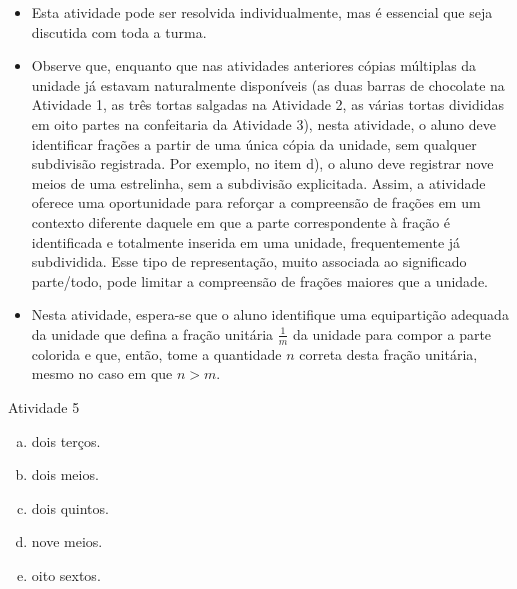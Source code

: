 \begin{multicols}{2}
  \begin{itemize} %
    \item       Esta atividade pode ser resolvida individualmente, mas é essencial que seja discutida com toda a turma.
    \item       Observe que, enquanto que nas atividades anteriores cópias múltiplas da unidade já estavam naturalmente disponíveis (as duas barras de chocolate na Atividade 1, as três tortas salgadas na Atividade 2, as várias tortas divididas em oito partes na confeitaria da Atividade 3), nesta atividade, o aluno deve identificar frações a partir de uma única cópia da unidade, sem qualquer subdivisão registrada. Por exemplo, no item d), o aluno deve registrar nove meios de uma estrelinha, sem a subdivisão explicitada. Assim, a atividade oferece uma oportunidade para reforçar a compreensão de frações em um contexto diferente daquele em que a parte correspondente à fração é identificada e totalmente inserida em uma unidade, frequentemente já subdividida. Esse tipo de representação, muito associada ao significado parte/todo, pode limitar a compreensão de frações maiores que a unidade.
    \item       Nesta atividade, espera-se que o aluno identifique uma equipartição adequada da unidade que defina a fração unitária       $\frac{1}{m}$ da unidade para compor a parte colorida e que, então, tome a quantidade       $n$ correta desta fração unitária, mesmo no caso em que       $n > m$.
\end{itemize} %


  \vspace{.1cm}


\newpage

\begin{resposta*}{Atividade 5}
  \begin{enumerate}[a)]
   \item dois terços.
   \item dois meios.
   \item dois quintos.
   \item nove meios.
   \item oito sextos.
\end{enumerate}
  \end{resposta*}


\end{multicols}

